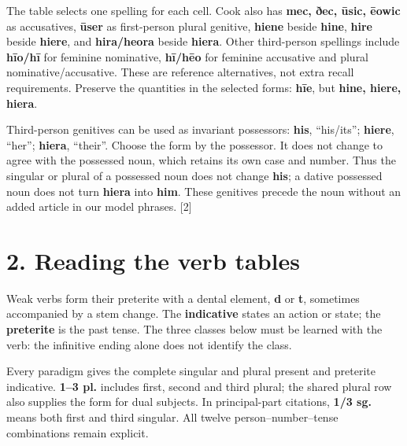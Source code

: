 The table selects one spelling for each cell. Cook also has \textbf{mec, ðec, ūsic, ēowic} as accusatives, \textbf{ūser} as first-person plural genitive, \textbf{hiene} beside \textbf{hine}, \textbf{hire} beside \textbf{hiere}, and \textbf{hira/\allowbreak{}heora} beside \textbf{hiera}. Other third-person spellings include \textbf{hīo/\allowbreak{}hī} for feminine nominative, \textbf{hī/\allowbreak{}hēo} for feminine accusative and plural nominative/\allowbreak{}accusative. These are reference alternatives, not extra recall requirements. Preserve the quantities in the selected forms: \textbf{hīe}, but \textbf{hine, hiere, hiera}.

Third-person genitives can be used as invariant possessors: \textbf{his}, “his/\allowbreak{}its”; \textbf{hiere}, “her”; \textbf{hiera}, “their”. Choose the form by the possessor. It does not change to agree with the possessed noun, which retains its own case and number. Thus the singular or plural of a possessed noun does not change \textbf{his}; a dative possessed noun does not turn \textbf{hiera} into \textbf{him}. These genitives precede the noun without an added article in our model phrases. [2]

\section*{2. Reading the verb tables}

Weak verbs form their preterite with a dental element, \textbf{d} or \textbf{t}, sometimes accompanied by a stem change. The \textbf{indicative} states an action or state; the \textbf{preterite} is the past tense. The three classes below must be learned with the verb: the infinitive ending alone does not identify the class.

Every paradigm gives the complete singular and plural present and preterite indicative. \textbf{1–3 pl.} includes first, second and third plural; the shared plural row also supplies the form for dual subjects. In principal-part citations, \textbf{1/\allowbreak{}3 sg.} means both first and third singular. All twelve person–number–tense combinations remain explicit.

